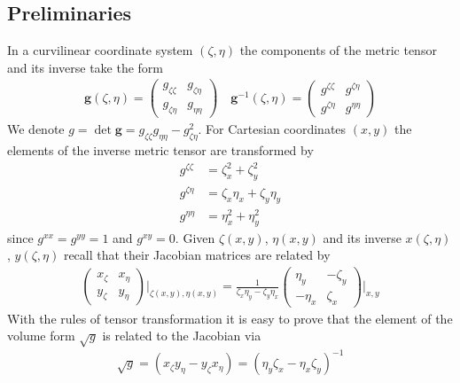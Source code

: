 \documentclass{hitec} %
\renewcommand{\d}{\mathrm{d}}
\renewcommand{\vec}[1]{{\mathbf{#1}}}
\begin{document}
\subsection{Preliminaries} \label{sec:preliminaries}
In a curvilinear
coordinate system $(\zeta,\eta)$ the components of the metric tensor and its inverse
take the form 
\begin{align}
  \vec g(\zeta,\eta) = \begin{pmatrix}
    g_{\zeta\zeta} & g_{\zeta\eta}  \\
    g_{\zeta\eta} & g_{\eta\eta}  
  \end{pmatrix}
  \quad
  \vec g^{-1}(\zeta,\eta) = \begin{pmatrix}
    g^{\zeta\zeta} & g^{\zeta\eta}  \\
    g^{\zeta\eta} & g^{\eta\eta}  
  \end{pmatrix}
  \label{}
\end{align}
We denote $g = \det{\vec g} = g_{\zeta\zeta}g_{\eta\eta}-g_{\zeta\eta}^2$.
For Cartesian coordinates $(x,y)$ the elements of the inverse metric tensor are 
transformed by
\begin{subequations}
\begin{align}
  g^{\zeta\zeta} &=  \zeta_x^2+\zeta_y^2\\
  g^{\zeta\eta} &=  \zeta_x \eta_x+\zeta_y \eta_y\\
  g^{\eta\eta} &=  \eta_x^2+\eta_y^2
  \label{}
\end{align}
\end{subequations}
since $g^{xx}=g^{yy}=1$ and $g^{xy}=0$. 
Given $\zeta(x,y)$, $\eta(x,y)$ and its inverse $x(\zeta,\eta)$, $y(\zeta,\eta)$ recall that their Jacobian matrices are related by
\begin{align}
  \begin{pmatrix}
    x_\zeta & x_\eta \\
    y_\zeta & y_\eta
  \end{pmatrix} \bigg\rvert_{\zeta(x,y),\eta(x,y)}
  =
  \frac{1}{\zeta_x\eta_y - \zeta_y\eta_x }\begin{pmatrix}
    \eta_y & -\zeta_y \\
    -\eta_x & \zeta_x
  \end{pmatrix}\bigg\rvert_{x,y} 
  \label{eq:inverse}
\end{align}
With the rules of tensor transformation it is easy to prove that the element of the volume form $\sqrt{g}$ is related to the Jacobian via
\begin{align}
\sqrt{g} = (x_\zeta y_\eta-y_\zeta x_\eta) = (\eta_y\zeta_x -\eta_x\zeta_y)^{-1}
  \label{eq:vol}
\end{align}
\end{document}
